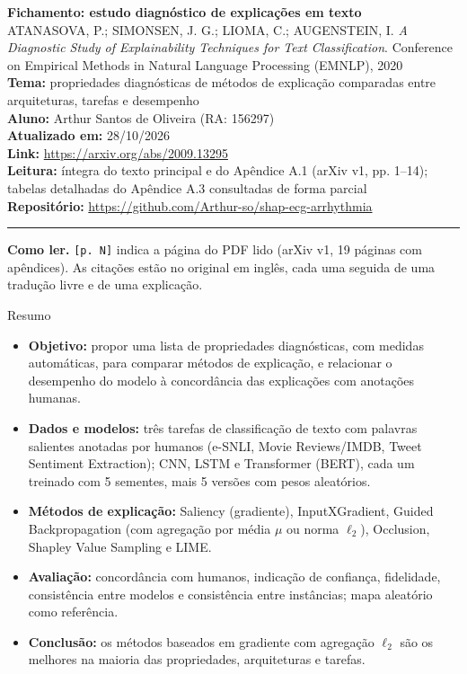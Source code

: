 \documentclass[11pt,a4paper]{article}
\begin{document}
\begin{center}
    {\LARGE \textbf{Fichamento: estudo diagnóstico de explicações em texto}} \\[0.35em]
    {\large ATANASOVA, P.; SIMONSEN, J. G.; LIOMA, C.; AUGENSTEIN, I. \textit{A Diagnostic Study of Explainability Techniques for Text Classification}. Conference on Empirical Methods in Natural Language Processing (EMNLP), 2020} \\[0.3em]
    \textbf{Tema:} propriedades diagnósticas de métodos de explicação comparadas entre arquiteturas, tarefas e desempenho \\[0.2em]
    \textbf{Aluno:} Arthur Santos de Oliveira (RA: 156297) \\[0.2em]
    \textbf{Atualizado em:} 28/10/2026 \\[0.2em]
    \textbf{Link:} \url{https://arxiv.org/abs/2009.13295} \\[0.2em]
    \textbf{Leitura:} íntegra do texto principal e do Apêndice A.1 (arXiv v1, pp. 1--14); tabelas detalhadas do Apêndice A.3 consultadas de forma parcial \\[0.2em]
    \textbf{Repositório:} \url{https://github.com/Arthur-so/shap-ecg-arrhythmia}
\end{center}
\vspace{-0.5em}
\hrule
\vspace{0.8em}

\textbf{Como ler.} \texttt{[p. N]} indica a página do PDF lido (arXiv v1, 19 páginas com apêndices). As citações estão no original em inglês, cada uma seguida de uma tradução livre e de uma explicação.

\begin{infobox}[note]{Resumo}
\begin{itemize}
  \item \textbf{Objetivo:} propor uma lista de propriedades diagnósticas, com medidas automáticas, para comparar métodos de explicação, e relacionar o desempenho do modelo à concordância das explicações com anotações humanas.
  \item \textbf{Dados e modelos:} três tarefas de classificação de texto com palavras salientes anotadas por humanos (e-SNLI, Movie Reviews/IMDB, Tweet Sentiment Extraction); CNN, LSTM e Transformer (BERT), cada um treinado com 5 sementes, mais 5 versões com pesos aleatórios.
  \item \textbf{Métodos de explicação:} Saliency (gradiente), InputXGradient, Guided Backpropagation (com agregação por média $\mu$ ou norma $\ell_2$), Occlusion, Shapley Value Sampling e LIME.
  \item \textbf{Avaliação:} concordância com humanos, indicação de confiança, fidelidade, consistência entre modelos e consistência entre instâncias; mapa aleatório como referência.
  \item \textbf{Conclusão:} os métodos baseados em gradiente com agregação $\ell_2$ são os melhores na maioria das propriedades, arquiteturas e tarefas.
\end{itemize}
\end{infobox}
\end{document}
